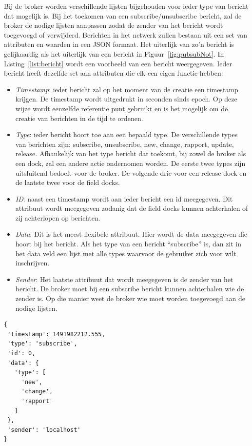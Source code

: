 Bij de broker worden verschillende lijsten bijgehouden voor ieder type van bericht dat mogelijk is.
Bij het toekomen van een subscribe/unsubscribe bericht, zal de broker de nodige lijsten aanpassen zodat de zender van het bericht wordt toegevoegd of verwijderd.
Berichten in het netwerk zullen bestaan uit een set van attributen en waarden in een JSON formaat.
Het uiterlijk van zo'n bericht is gelijkaardig als het uiterlijk van een bericht in Figuur~\vref{fig:pubsubNot}.
In Listing~\vref{list:bericht} wordt een voorbeeld van een bericht weergegeven.
Ieder bericht heeft dezelfde set aan attributen die elk een eigen functie hebben:
\begin{itemize}
\item \emph{Timestamp}: ieder bericht zal op het moment van de creatie een timestamp krijgen.
De timestamp wordt uitgedrukt in seconden sinds epoch.
Op deze wijze wordt eenzelfde referentie punt gebruikt en is het mogelijk om de creatie van berichten in de tijd te ordenen.
\item \emph{Type}: ieder bericht hoort toe aan een bepaald type.
De verschillende types van berichten zijn: subscribe, unsubscribe, new, change, rapport, update, release.
Afhankelijk van het type bericht dat toekomt, bij zowel de broker als een dock, zal een andere actie ondernomen worden.
De eerste twee types zijn uitsluitend bedoelt voor de broker.
De volgende drie voor een release dock en de laatste twee voor de field docks.
\item \emph{ID}: naast een timestamp wordt aan ieder bericht een id meegegeven. 
Dit attribuut wordt meegegeven zodanig dat de field docks kunnen achterhalen of zij achterlopen op berichten.
\item \emph{Data}: Dit is het meest flexibele attribuut. 
Hier wordt de data meegegeven die hoort bij het bericht.
Als het type van een bericht ``subscribe'' is, dan zit in het data veld een lijst met alle types waarvoor de gebruiker zich voor wilt inschrijven.
\item \emph{Sender}: Het laatste attribuut dat wordt meegegeven is de zender van het bericht.
De broker moet bij een subscribe bericht kunnen achterhalen wie de zender is.
Op die manier weet de broker wie moet worden toegevoegd aan de nodige lijsten.
\end{itemize}

\begin{minipage}{\linewidth}
\begin{center}
\begin{lstlisting}[caption={Formaat voor een bericht},label={list:bericht}, xleftmargin=.3\textwidth]
{
 'timestamp': 1491982212.555,
 'type': 'subscribe',
 'id': 0,
 'data': {
   'type': [
     'new',
     'change',
     'rapport'
   ]
 },
 'sender': 'localhost'
}
\end{lstlisting}
\end{center}
\end{minipage}

